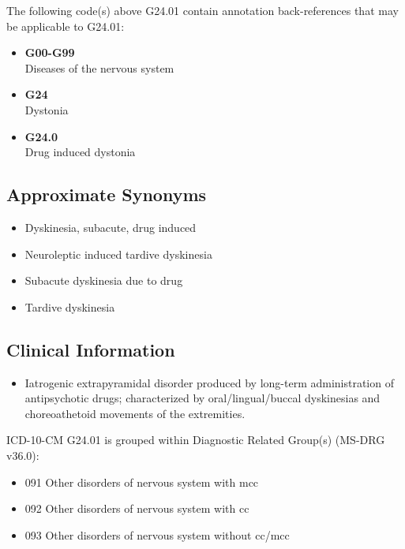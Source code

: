 The following code(s) above G24.01 contain annotation back-references that may be applicable to G24.01:

\begin{itemize}
\tightlist
\item
  \textbf{G00-G99}\\
  Diseases of the nervous system
\item
  \textbf{G24}\\
  Dystonia
\item
  \textbf{G24.0}\\
  Drug induced dystonia
\end{itemize}

\hypertarget{approximate-synonyms-2}{%
\subsection{Approximate Synonyms}\label{approximate-synonyms-2}}

\begin{itemize}
\tightlist
\item
  Dyskinesia, subacute, drug induced
\item
  Neuroleptic induced tardive dyskinesia
\item
  Subacute dyskinesia due to drug
\item
  Tardive dyskinesia
\end{itemize}

\hypertarget{clinical-information-1}{%
\subsection{Clinical Information}\label{clinical-information-1}}

\begin{itemize}
\tightlist
\item
  Iatrogenic extrapyramidal disorder produced by long-term administration of antipsychotic drugs; characterized by oral/lingual/buccal dyskinesias and choreoathetoid movements of the extremities.
\end{itemize}

ICD-10-CM G24.01 is grouped within Diagnostic Related Group(s) (MS-DRG v36.0):

\begin{itemize}
\tightlist
\item
  091 Other disorders of nervous system with mcc
\item
  092 Other disorders of nervous system with cc
\item
  093 Other disorders of nervous system without cc/mcc
\end{itemize}
